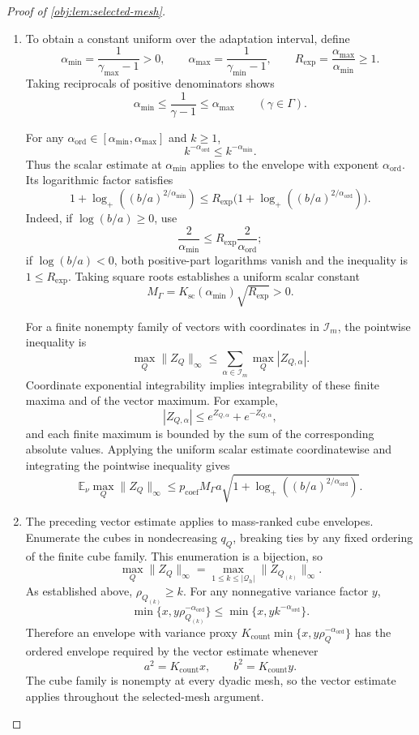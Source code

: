 \documentclass[11pt]{article}
\begin{document}
\begin{proof}[Proof of \cref{obj:lem:selected-mesh}]
\begin{enumerate}
\item To obtain a constant uniform over the adaptation interval, define
\[
\alpha_{\min}=\frac1{\gamma_{\max}-1}>0,\qquad
\alpha_{\max}=\frac1{\gamma_{\min}-1},
\qquad
R_{\mathrm{exp}}=\frac{\alpha_{\max}}{\alpha_{\min}}\ge1.
\]
Taking reciprocals of positive denominators shows
\[
\alpha_{\min}\le\frac1{\gamma-1}\le\alpha_{\max}
\qquad(\gamma\in\Gamma).
\]

For any \(\alpha_{\mathrm{ord}}\in[\alpha_{\min},\alpha_{\max}]\) and
\(k\ge1\),
\[
k^{-\alpha_{\mathrm{ord}}}\le k^{-\alpha_{\min}}.
\]
Thus the scalar estimate at \(\alpha_{\min}\) applies to the envelope
with exponent \(\alpha_{\mathrm{ord}}\). Its logarithmic factor satisfies
\[
1+\log_+((b/a)^{2/\alpha_{\min}})
\le
R_{\mathrm{exp}}
\bigl(1+\log_+((b/a)^{2/\alpha_{\mathrm{ord}}})\bigr).
\]
Indeed, if \(\log(b/a)\ge0\), use
\[
\frac2{\alpha_{\min}}
\le R_{\mathrm{exp}}\frac2{\alpha_{\mathrm{ord}}};
\]
if \(\log(b/a)<0\), both positive-part logarithms vanish and the
inequality is \(1\le R_{\mathrm{exp}}\).
Taking square roots establishes a uniform scalar constant
\[
M_\Gamma
=
K_{\mathrm{sc}}(\alpha_{\min})\sqrt{R_{\mathrm{exp}}}>0.
\]

For a finite nonempty family of vectors with coordinates in
\(\mathcal I_m\), the pointwise inequality is
\[
\max_Q\|Z_Q\|_\infty
\le
\sum_{\alpha\in\mathcal I_m}\max_Q|Z_{Q,\alpha}|.
\]
Coordinate exponential integrability implies integrability of these
finite maxima and of the vector maximum. For example,
\[
|Z_{Q,\alpha}|
\le e^{Z_{Q,\alpha}}+e^{-Z_{Q,\alpha}},
\]
and each finite maximum is bounded by the sum of the corresponding
absolute values. Applying the uniform scalar estimate coordinatewise
and integrating the pointwise inequality gives
\[
\mathbb E_\nu\max_Q\|Z_Q\|_\infty
\le
p_{\mathrm{coef}}M_\Gamma a
\sqrt{1+\log_+((b/a)^{2/\alpha_{\mathrm{ord}}})}.
\]

\item The preceding vector estimate applies to mass-ranked cube
envelopes. Enumerate the cubes in nondecreasing \(q_Q\), breaking ties
by any fixed ordering of the finite cube family. This enumeration is a
bijection, so
\[
\max_Q\|Z_Q\|_\infty
=
\max_{1\le k\le|\mathcal Q_h|}\|Z_{Q_{(k)}}\|_\infty.
\]
As established above, \(\rho_{Q_{(k)}}\ge k\). For any nonnegative
variance factor \(y\),
\[
\min\{x,y\rho_{Q_{(k)}}^{-\alpha_{\mathrm{ord}}}\}
\le
\min\{x,yk^{-\alpha_{\mathrm{ord}}}\}.
\]
Therefore an envelope with variance proxy
\(K_{\mathrm{count}}\min\{x,y\rho_Q^{-\alpha_{\mathrm{ord}}}\}\)
has the ordered envelope required by the vector estimate whenever
\[
a^2=K_{\mathrm{count}}x,\qquad
b^2=K_{\mathrm{count}}y.
\]
The cube family is nonempty at every dyadic mesh, so the vector estimate
applies throughout the selected-mesh argument.


\end{enumerate}
\end{proof}
\end{document}
